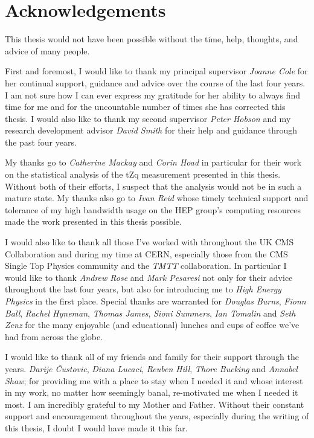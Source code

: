 \documentclass[11pt,a4paper]{report}
\begin{document}
\clearpage
\newpage

\chapter*{Acknowledgements} \label{sec:acknowledgments}
This thesis would not have been possible without the time, help, thoughts, and advice of many people.

First and foremost, I would like to thank my principal supervisor \textit{Joanne Cole} for her continual support, guidance and advice over the course of the last four years.
I am not sure how I can ever express my gratitude for her ability to always find time for me and for the uncountable number of times she has corrected this thesis.
I would also like to thank my second supervisor \emph{Peter Hobson} and my research development advisor \emph{David Smith} for their help and guidance through the past four years.

My thanks go to \textit{Catherine Mackay} and \textit{Corin Hoad} in particular for their work on the statistical analysis of the tZq measurement presented in this thesis.
Without both of their efforts, I suspect that the analysis would not be in such a mature state.
My thanks also go to \textit{Ivan Reid} whose timely technical support and tolerance of my high bandwidth usage on the HEP group's computing resources made the work presented in this thesis possible.

I would also like to thank all those I've worked with throughout the UK CMS Collaboration and during my time at CERN, especially those from the CMS Single Top Physics community and the \emph{TMTT} collaboration.
In particular I would like to thank \textit{Andrew Rose} and \textit{Mark Pesaresi} not only for their advice throughout the last four years, but also for introducing me to \emph{High Energy Physics} in the first place.
Special thanks are warranted for \textit{Douglas Burns}, \textit{Fionn Ball}, \textit{Rachel Hyneman}, \textit{Thomas James}, \textit{Sioni Summers}, \textit{Ian Tomalin} and \textit{Seth Zenz} for the many enjoyable (and educational) lunches and cups of coffee we've had from across the globe.

I would like to thank all of my friends and family for their support through the years.
\textit{Darije \v{C}ustovi{c}}, \textit{Diana Lucaci}, \textit{Reuben Hill}, \textit{Thore Bucking} and \textit{Annabel Shaw}; for providing me with a place to stay when I needed it and whose interest in my work, no matter how seemingly banal, re-motivated me when I needed it most.
I am incredibly grateful to my Mother and Father.
Without their constant support and encouragement throughout the years, especially during the writing of this thesis, I doubt I would have made it this far.
\end{document}
